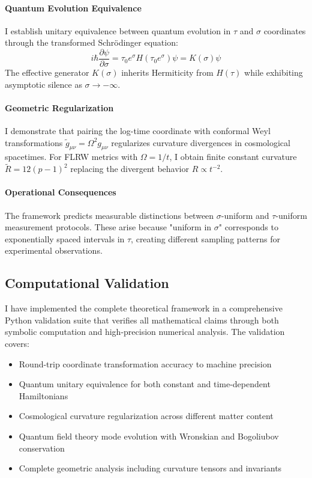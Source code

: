 \paragraph{Quantum Evolution Equivalence} I establish unitary equivalence between quantum evolution in $\tau$ and $\sigma$ coordinates through the transformed Schrödinger equation:
\begin{equation}
i\hbar \frac{\partial \psi}{\partial \sigma} = \tau_0 e^\sigma H(\tau_0 e^\sigma) \psi = K(\sigma) \psi
\end{equation}
The effective generator $K(\sigma)$ inherits Hermiticity from $H(\tau)$ while exhibiting asymptotic silence as $\sigma \to -\infty$.

\paragraph{Geometric Regularization} I demonstrate that pairing the log-time coordinate with conformal Weyl transformations $\tilde{g}_{\mu\nu} = \Omega^2 g_{\mu\nu}$ regularizes curvature divergences in cosmological spacetimes. For FLRW metrics with $\Omega = 1/t$, I obtain finite constant curvature $\tilde{R} = 12(p-1)^2$ replacing the divergent behavior $R \propto t^{-2}$.

\paragraph{Operational Consequences} The framework predicts measurable distinctions between $\sigma$-uniform and $\tau$-uniform measurement protocols. These arise because "uniform in $\sigma$" corresponds to exponentially spaced intervals in $\tau$, creating different sampling patterns for experimental observations.

\subsection{Computational Validation}

I have implemented the complete theoretical framework in a comprehensive Python validation suite that verifies all mathematical claims through both symbolic computation and high-precision numerical analysis. The validation covers:
\begin{itemize}
\item Round-trip coordinate transformation accuracy to machine precision
\item Quantum unitary equivalence for both constant and time-dependent Hamiltonians
\item Cosmological curvature regularization across different matter content
\item Quantum field theory mode evolution with Wronskian and Bogoliubov conservation
\item Complete geometric analysis including curvature tensors and invariants
\end{itemize}

